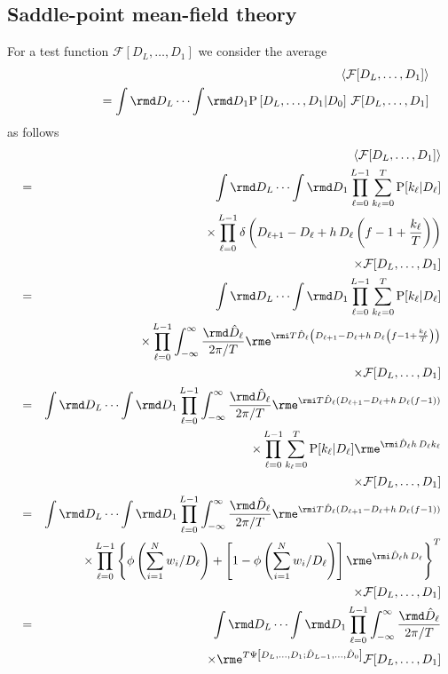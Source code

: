 \documentclass[10pt]{iopart}
\newcommand{\1}{\mathbf{1}}
\newcommand{\Prob}{\mathrm{P}}
\begin{document}
\subsection{Saddle-point mean-field theory}
%
For a test function $\mathcal{F}[D_{L},\ldots,D_{1}]$ we consider the average 
%
\begin{eqnarray}
%
&&\langle\mathcal{F}[D_{L},\ldots,D_{1}]\rangle\nonumber\\
&&~~~~~~~~~~~~~~=\int\rmd D_{L}\cdots\int\rmd D_{1}\Prob\left[D_{L},\ldots,D_{1}\vert D_{0}\right]
\,\mathcal{F}[D_{L},\ldots,D_{1}]\label{def:F-aver}
%
\end{eqnarray}
%
as follows
%
\begin{eqnarray}
&&\langle\mathcal{F}[D_{L},\ldots,D_{1}]\rangle\nonumber\\
%
&=&\int\rmd D_{L}\cdots\int\rmd D_{1}\prod_{\ell=0}^{L-1}\sum_{k_\ell=0}^T\Prob[k_\ell\vert D_\ell]\nonumber\\
&&\times\prod_{\ell=0}^{L-1}\delta\left(D_{\ell+1}- D_{\ell}+ h\,D_{\ell}\left(f- 1+\frac{k_{\ell}}{T}\right)\right)\nonumber\\
%
&&\times \mathcal{F}[D_{L},\ldots,D_{1}]\nonumber\\
%
&=&\int\rmd D_{L}\cdots\int\rmd D_{1}\prod_{\ell=0}^{L-1}\sum_{k_\ell=0}^T\Prob[k_\ell\vert D_\ell]\nonumber\\
&&\times\prod_{\ell=0}^{L-1}\int_{-\infty}^{\infty}\frac{\rmd\hat{D}_\ell}{2\pi/T}\rme^{\rmi T\hat{D}_\ell\left(D_{\ell+1}- D_{\ell}+ h\,D_{\ell}\left(f- 1+\frac{k_{\ell}}{T}\right)\right)}
\nonumber\\
%
&&\times \mathcal{F}[D_{L},\ldots,D_{1}]\nonumber\\
%
&=&\int\rmd D_{L}\cdots\int\rmd D_{1}\prod_{\ell=0}^{L-1}\int_{-\infty}^{\infty}\frac{\rmd\hat{D}_\ell}{2\pi/T}\rme^{\rmi T\hat{D}_\ell\left(D_{\ell+1}- D_{\ell}+ h\,D_{\ell}\left(f- 1\right)\right)}\nonumber\\
&&\times\prod_{\ell=0}^{L-1}\sum_{k_\ell=0}^T\Prob[k_\ell\vert D_\ell] \rme^{\rmi \hat{D}_\ell h\,D_{\ell}k_{\ell} }
\nonumber\\
%
&&\times \mathcal{F}[D_{L},\ldots,D_{1}]\nonumber\\
%
&=&\int\rmd D_{L}\cdots\int\rmd D_{1}\prod_{\ell=0}^{L-1}\int_{-\infty}^{\infty}\frac{\rmd\hat{D}_\ell}{2\pi/T}\rme^{\rmi T\hat{D}_\ell\left(D_{\ell+1}- D_{\ell}+ h\,D_{\ell}\left(f- 1\right)\right)}\nonumber\\
&&\times\prod_{\ell=0}^{L-1}\left\{ \phi\left(\sum_{i=1}^Nw_i/D_\ell\right)+\left[1-\phi\left(\sum_{i=1}^Nw_i/D_\ell\right)\right]\rme^{\rmi \hat{D}_\ell h\,D_{\ell}}\right\}^T
\nonumber\\
%
&&\times \mathcal{F}[D_{L},\ldots,D_{1}]\nonumber\\
%
&=&\int\rmd D_{L}\cdots\int\rmd D_{1}\prod_{\ell=0}^{L-1}\int_{-\infty}^{\infty}\frac{\rmd\hat{D}_\ell}{2\pi/T}\nonumber\\
&&\times\rme^{T\Psi\left[D_{L},\ldots,D_{1};\hat{D}_{L-1},\ldots,\hat{D}_0\right]} \mathcal{F}[D_{L},\ldots,D_{1}]
%
\end{eqnarray}
\end{document}
